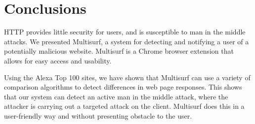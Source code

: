\section{Conclusions}
\label{sec:conclusion}

HTTP provides little security for users, and is susceptible to man in the middle attacks.  We presented Multisurf, a system for detecting and notifying a user of a potentially malicious website.  Multisurf is a Chrome browser extension that allows for easy access and usability.  

Using the Alexa Top 100 sites, we have shown that Multisurf can use a variety of comparison algorithms to detect differences in web page responses.  This shows that our system can detect an active man in the middle attack, where the attacker is carrying out a targeted attack on the client.  Multisurf does this in a user-friendly way and without presenting obstacle to the user.  
